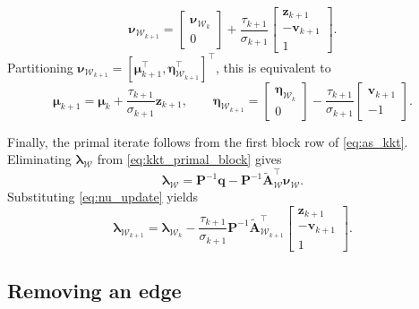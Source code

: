\documentclass[a4paper,12pt,openany]{book}
\newcommand{\A}{\mathbf{A}}
\renewcommand{\P}{\mathbf{P}}
\newcommand{\q}{\mathbf{q}}
\renewcommand{\v}{\mathbf{v}}
\newcommand{\z}{\mathbf{z}}
\newcommand{\lh}{\boldsymbol{\lambda}}
\begin{document}
\begin{appendices}
\begin{equation}
	\label{eq:nu_update}
	\boldsymbol{\nu}_{\mathcal{W}_{k+1}}
	=
	\begin{bmatrix}
		\boldsymbol{\nu}_{\mathcal{W}_k} \\ 0
	\end{bmatrix}
	+
	\frac{\tau_{k+1}}{\sigma_{k+1}}
	\begin{bmatrix}
		\z_{k+1} \\ -\v_{k+1} \\ 1
	\end{bmatrix}.
\end{equation}
Partitioning $\boldsymbol{\nu}_{\mathcal{W}_{k+1}}=[\boldsymbol{\mu}_{k+1}^\top,\boldsymbol{\eta}_{\mathcal{W}_{k+1}}^\top]^\top$, this is equivalent to
\begin{equation}
	\label{eq:eta_mu_update_direct}
	\boldsymbol{\mu}_{k+1}
	=
	\boldsymbol{\mu}_k + \frac{\tau_{k+1}}{\sigma_{k+1}}\z_{k+1},
	\qquad
	\boldsymbol{\eta}_{\mathcal{W}_{k+1}}
	=
	\begin{bmatrix}
		\boldsymbol{\eta}_{\mathcal{W}_k} \\ 0
	\end{bmatrix}
	-
	\frac{\tau_{k+1}}{\sigma_{k+1}}
	\begin{bmatrix}
		\v_{k+1} \\ -1
	\end{bmatrix}.
\end{equation}

Finally, the primal iterate follows from the first block row of \eqref{eq:as_kkt}. Eliminating $\lh_\mathcal{W}$ from \eqref{eq:kkt_primal_block} gives
\begin{equation}
	\label{eq:lambda_from_nu}
	\lh_{\mathcal{W}}
	=
	\P^{-1}\q - \P^{-1}\tilde{\A}_{\mathcal{W}}^\top\boldsymbol{\nu}_{\mathcal{W}}.
\end{equation}
Substituting \eqref{eq:nu_update} yields
\begin{equation}
	\label{eq:lambda_update}
	\lh_{\mathcal{W}_{k+1}}
	=
	\lh_{\mathcal{W}_k}
	-
	\frac{\tau_{k+1}}{\sigma_{k+1}}\P^{-1}\tilde{\A}_{\mathcal{W}_{k+1}}^\top
	\begin{bmatrix}
		\z_{k+1} \\ -\v_{k+1} \\ 1
	\end{bmatrix}.
\end{equation}

\subsection{Removing an edge}
\label{subsec:removing_edge}


\end{appendices}
\end{document}
